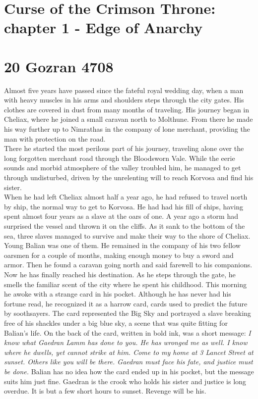 \section{Curse of the Crimson Throne: chapter 1 - Edge of Anarchy}

\section{20 Gozran 4708}

Almost five years have passed since the fateful royal wedding day, when a man with heavy muscles in his arms and shoulders steps through the city gates. His clothes are covered in dust from many months of traveling. His journey began in Cheliax, where he joined a small caravan north to Molthune. From there he made his way further up to Nimrathas in the company of lone merchant, providing the man with protection on the road.\\

There he started the most perilous part of his journey, traveling alone over the long forgotten merchant road through the Bloodsworn Vale. While the eerie sounds and morbid atmosphere of the valley troubled him, he managed to get through undisturbed, driven by the unrelenting will to reach Korvosa and find his sister.\\

When he had left Cheliax almost half a year ago, he had refused to travel north by ship, the normal way to get to Korvosa. He had had his fill of ships, having spent almost four years as a slave at the oars of one. A year ago a storm had surprised the vessel and thrown it on the cliffs. As it sank to the bottom of the sea, three slaves managed to survive and make their way to the shore of Cheliax. Young Balian was one of them. He remained in the company of his two fellow oarsmen for a couple of months, making enough money to buy a sword and armor. Then he found a caravan going north and said farewell to his companions.\\

Now he has finally reached his destination. As he steps through the gate, he smells the familiar scent of the city where he spent his childhood. This morning he awoke with a strange card in his pocket. Although he has never had his fortune read, he recognized it as a harrow card, cards used to predict the future by soothsayers. The card represented the Big Sky and portrayed a slave breaking free of his shackles under a big blue sky, a scene that was quite fitting for Balian's life. On the back of the card, written in bold ink, was a short message:  {\itshape I know what Gaedran Lamm has done to you. He has wronged me as well. I know where he dwells, yet cannot strike at him. Come to my home at 3 Lancet Street at sunset. Others like you will be there. Gaedran must face his fate, and justice must be done.}  Balian has no idea how the card ended up in his pocket, but the message suits him just fine. Gaedran is the crook who holds his sister and justice is long overdue. It is but a few short hours to sunset. Revenge will be his.\\

